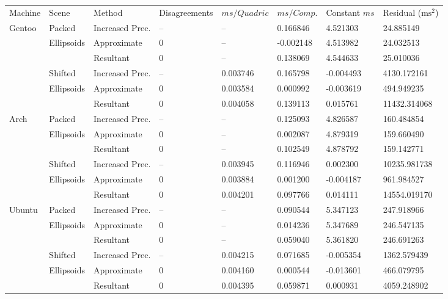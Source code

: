\begin{tabular}{|l|l|ll|lll|l|}
\hline
Machine & Scene & Method & Disagreements & $ms/Quadric$ & $ms/Comp.$ & Constant $ms$ & Residual ($\text{ms}^2$)\\
\hhline{|=|=|==|===|=|}
Gentoo & Packed & Increased Prec. & -- & -- & 0.166846 & 4.521303 & 24.885149\\
& Ellipsoids & Approximate & 0 & -- & -0.002148 & 4.513982 & 24.032513\\
&& Resultant & 0 & -- & 0.138069 & 4.544633 & 25.010036\\
\hline
& Shifted & Increased Prec. & -- & 0.003746 & 0.165798 & -0.004493 & 4130.172161\\
& Ellipsoids & Approximate & 0 & 0.003584 & 0.000992 & -0.003619 & 494.949235\\
&& Resultant & 0 & 0.004058 & 0.139113 & 0.015761 & 11432.314068\\
\hline
Arch & Packed & Increased Prec. & -- & -- & 0.125093 & 4.826587 & 160.484854\\
& Ellipsoids & Approximate & 0 & -- & 0.002087 & 4.879319 & 159.660490\\
&& Resultant & 0 & -- & 0.102549 & 4.878792 & 159.142771\\
\hline
& Shifted & Increased Prec. & -- & 0.003945 & 0.116946 & 0.002300 & 10235.981738\\
& Ellipsoids & Approximate & 0 & 0.003884 & 0.001200 & -0.004187 & 961.984527\\
&& Resultant & 0 & 0.004201 & 0.097766 & 0.014111 & 14554.019170\\
\hline
Ubuntu & Packed & Increased Prec. & -- & -- & 0.090544 & 5.347123 & 247.918966\\
& Ellipsoids & Approximate & 0 & -- & 0.014236 & 5.347689 & 246.547135\\
&& Resultant & 0 & -- & 0.059040 & 5.361820 & 246.691263\\
\hline
& Shifted & Increased Prec. & -- & 0.004215 & 0.071685 & -0.005354 & 1362.579439\\
& Ellipsoids & Approximate & 0 & 0.004160 & 0.000544 & -0.013601 & 466.079795\\
&& Resultant & 0 & 0.004395 & 0.059871 & 0.000931 & 4059.248902\\
\hline
\end{tabular}
